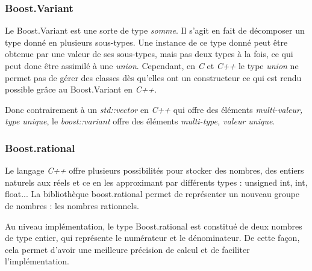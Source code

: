 \subsubsection*{Boost.Variant}

Le Boost.Variant est une sorte de type \textit{somme}. Il s'agit en fait de décomposer un type donné en plusieurs sous-types. Une instance de ce type donné peut être obtenue par une valeur de ses sous-types, mais pas deux types à la fois, ce qui peut donc  être assimilé à une \textit{union}. Cependant, en \textit{C} et \textit{C++} le type \textit{union} ne permet pas de gérer des classes dès qu'elles ont un constructeur ce qui est rendu possible grâce au Boost.Variant en \textit{C++}.

Donc contrairement à un \textit{std::vector} en \textit{C++} qui offre des éléments \textit{multi-valeur, type unique}, le \textit{boost::variant} offre des éléments \textit{multi-type, valeur unique}.


\subsubsection*{Boost.rational}

Le langage \textit{C++} offre plusieurs possibilités pour stocker des nombres, des entiers naturels aux réels et ce en les approximant par différents types : unsigned int, int, float... La bibliothèque boost.rational permet de représenter un nouveau groupe de nombres : les nombres rationnels.

Au niveau implémentation, le type Boost.rational est constitué de deux nombres de type entier, qui représente le numérateur et le dénominateur. De cette façon, cela permet d'avoir une meilleure précision de calcul et de faciliter l'implémentation.


